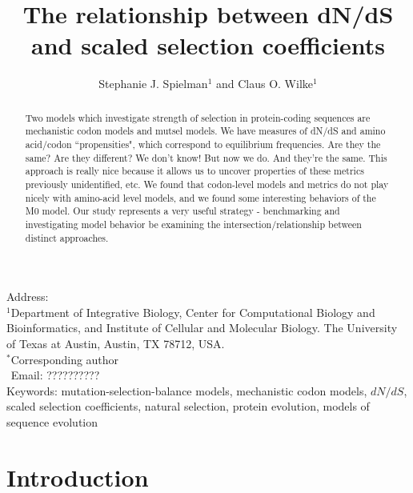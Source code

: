 \documentclass[11pt]{article}
\begin{document}
\title{\textbf{The relationship between dN/dS and scaled selection coefficients}}
\author{Stephanie J. Spielman$^{1}$ and Claus O. Wilke$^{1}$}
\date{}

\maketitle
\noindent
Address:\\
$^1$Department of Integrative Biology, Center for Computational Biology and Bioinformatics, and Institute of Cellular and Molecular Biology.
The University of Texas at Austin, Austin, TX 78712, USA.\\

\bigskip
\noindent
$^*$Corresponding author\\
$\phantom{^*}$Email: ??????????\\

\bigskip
\noindent Keywords: mutation-selection-balance models, mechanistic codon models, $dN/dS$, scaled selection coefficients, natural selection, protein evolution, models of sequence evolution

\newpage
\begin{abstract}
Two models which investigate strength of selection in protein-coding sequences are mechanistic codon models and mutsel models. We have measures of dN/dS and amino acid/codon ``propensities", which correspond to equilibrium frequencies. Are they the same? Are they different? We don't know! But now we do. And they're the same. This approach is really nice because it allows us to uncover properties of these metrics previously unidentified, etc. We found that codon-level models and metrics do not play nicely with amino-acid level models, and we found some interesting behaviors of the M0 model. Our study represents a very useful strategy - benchmarking and investigating model behavior be examining the intersection/relationship between distinct approaches.
  
\end{abstract}


\section*{Introduction}
\end{document}
